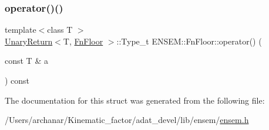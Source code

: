 \mbox{\label{structENSEM_1_1FnFloor_a4452d47aaa4edbfb7644f14a1b3e55f0}} 
\subsubsection{\texorpdfstring{operator()()}{operator()()}\hspace{0.1cm}{\footnotesize\ttfamily [2/2]}}
{\footnotesize\ttfamily template$<$class T $>$ \\
\mbox{\hyperlink{structENSEM_1_1UnaryReturn}{Unary\+Return}}$<$T, \mbox{\hyperlink{structENSEM_1_1FnFloor}{Fn\+Floor}} $>$\+::Type\+\_\+t E\+N\+S\+E\+M\+::\+Fn\+Floor\+::operator() (\begin{DoxyParamCaption}\item[{const T \&}]{a }\end{DoxyParamCaption}) const\hspace{0.3cm}{\ttfamily [inline]}}



The documentation for this struct was generated from the following file\+:\begin{DoxyCompactItemize}
\item 
/\+Users/archanar/\+Kinematic\+\_\+factor/adat\+\_\+devel/lib/ensem/\mbox{\hyperlink{lib_2ensem_2ensem_8h}{ensem.\+h}}\end{DoxyCompactItemize}
